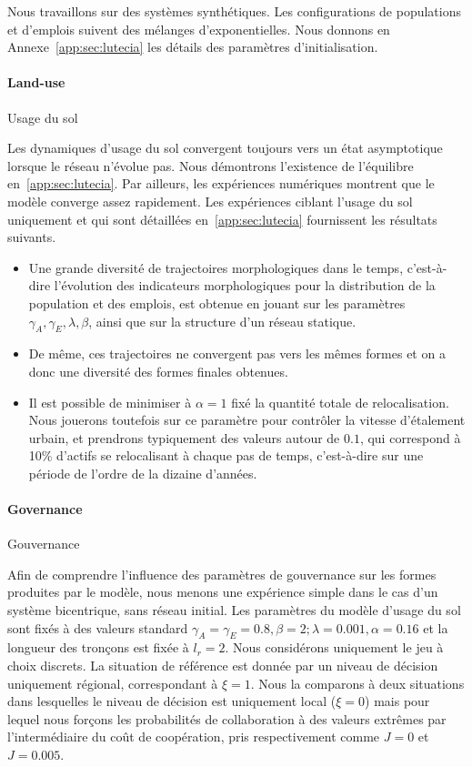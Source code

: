 Nous travaillons sur des systèmes synthétiques. Les configurations de populations et d'emplois suivent des mélanges d'exponentielles. Nous donnons en Annexe~\ref{app:sec:lutecia} les détails des paramètres d'initialisation.


\paragraph{Land-use}{Usage du sol}

Les dynamiques d'usage du sol convergent toujours vers un état asymptotique lorsque le réseau n'évolue pas. Nous démontrons l'existence de l'équilibre en~\ref{app:sec:lutecia}. Par ailleurs, les expériences numériques montrent que le modèle converge assez rapidement. Les expériences ciblant l'usage du sol uniquement et qui sont détaillées en~\ref{app:sec:lutecia} fournissent les résultats suivants.
\begin{itemize}
	\item Une grande diversité de trajectoires morphologiques dans le temps, c'est-à-dire l'évolution des indicateurs morphologiques pour la distribution de la population et des emplois, est obtenue en jouant sur les paramètres $\gamma_A, \gamma_E, \lambda, \beta$, ainsi que sur la structure d'un réseau statique.
	\item De même, ces trajectoires ne convergent pas vers les mêmes formes et on a donc une diversité des formes finales obtenues.
	\item Il est possible de minimiser à $\alpha = 1$ fixé la quantité totale de relocalisation. Nous jouerons toutefois sur ce paramètre pour contrôler la vitesse d'étalement urbain, et prendrons typiquement des valeurs autour de $0.1$, qui correspond à 10\% d'actifs se relocalisant à chaque pas de temps, c'est-à-dire sur une période de l'ordre de la dizaine d'années.
\end{itemize}



\paragraph{Governance}{Gouvernance}

Afin de comprendre l'influence des paramètres de gouvernance sur les formes produites par le modèle, nous menons une expérience simple dans le cas d'un système bicentrique, sans réseau initial. Les paramètres du modèle d'usage du sol sont fixés à des valeurs standard $\gamma_A = \gamma_E = 0.8, \beta = 2 ; \lambda = 0.001, \alpha = 0.16$ et la longueur des tronçons est fixée à $l_r = 2$. Nous considérons uniquement le jeu à choix discrets. La situation de référence est donnée par un niveau de décision uniquement régional, correspondant à $\xi = 1$. Nous la comparons à deux situations dans lesquelles le niveau de décision est uniquement local ($\xi = 0$) mais pour lequel nous forçons les probabilités de collaboration à des valeurs extrêmes par l'intermédiaire du coût de coopération, pris respectivement comme $J=0$ et $J=0.005$.


